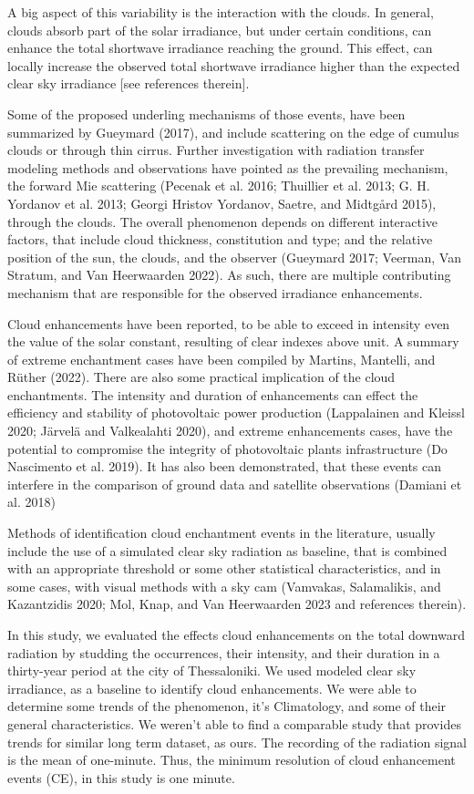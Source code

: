 \documentclass[
  preprint, 3p, authoryear]{article}
\begin{document}
A big aspect of this variability is the interaction with the clouds. In general,
clouds absorb part of the solar irradiance, but under certain conditions, can enhance
the total shortwave irradiance reaching the ground. This effect, can locally increase
the observed total shortwave irradiance higher than the expected clear sky irradiance
{[}see references therein{]}.

Some of the proposed underling mechanisms of those events, have been summarized by
Gueymard (2017), and include scattering on the edge of cumulus clouds or through thin
cirrus. Further investigation with radiation transfer modeling methods and
observations have pointed as the prevailing mechanism, the forward Mie scattering
(Pecenak et al. 2016; Thuillier et al. 2013; G. H. Yordanov et al. 2013; Georgi Hristov Yordanov, Saetre, and Midtgård 2015), through the clouds.
The overall phenomenon depends on different interactive factors, that include cloud
thickness, constitution and type; and the relative position of the sun, the clouds,
and the observer (Gueymard 2017; Veerman, Van Stratum, and Van Heerwaarden 2022). As such, there are multiple
contributing mechanism that are responsible for the observed irradiance enhancements.

Cloud enhancements have been reported, to be able to exceed in intensity even the
value of the solar constant, resulting of clear indexes above unit. A summary of
extreme enchantment cases have been compiled by Martins, Mantelli, and Rüther (2022). There are also some
practical implication of the cloud enchantments. The intensity and duration of
enhancements can effect the efficiency and stability of photovoltaic power production
(Lappalainen and Kleissl 2020; Järvelä and Valkealahti 2020), and extreme enhancements cases, have the
potential to compromise the integrity of photovoltaic plants infrastructure
(Do Nascimento et al. 2019). It has also been demonstrated, that these events can interfere
in the comparison of ground data and satellite observations (Damiani et al. 2018)

Methods of identification cloud enchantment events in the literature, usually include
the use of a simulated clear sky radiation as baseline, that is combined with an
appropriate threshold or some other statistical characteristics, and in some cases,
with visual methods with a sky cam (Vamvakas, Salamalikis, and Kazantzidis 2020; Mol, Knap, and Van Heerwaarden 2023 and references therein).

In this study, we evaluated the effects cloud enhancements on the total downward
radiation by studding the occurrences, their intensity, and their duration in a
thirty-year period at the city of Thessaloniki. We used modeled clear sky
irradiance, as a baseline to identify cloud enhancements. We were able to determine
some trends of the phenomenon, it's Climatology, and some of their general
characteristics. We weren't able to find a comparable study that provides trends for
similar long term dataset, as ours. The recording of the radiation signal is the
mean of one-minute. Thus, the minimum resolution of cloud enhancement events (CE), in
this study is one minute.
\end{document}
